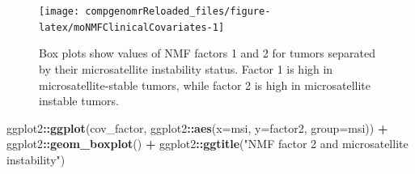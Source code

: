 \documentclass[12pt,]{krantz}
\newenvironment{Shaded}{\begin{snugshade}}{\end{snugshade}}
\newcommand{\DataTypeTok}[1]{\textcolor[rgb]{0.13,0.29,0.53}{#1}}
\newcommand{\KeywordTok}[1]{\textcolor[rgb]{0.13,0.29,0.53}{\textbf{#1}}}
\newcommand{\NormalTok}[1]{#1}
\newcommand{\OperatorTok}[1]{\textcolor[rgb]{0.81,0.36,0.00}{\textbf{#1}}}
\newcommand{\StringTok}[1]{\textcolor[rgb]{0.31,0.60,0.02}{#1}}
\begin{document}
\begin{Shaded}
\end{Shaded}

\begin{figure}

{\centering \texttt{[image: compgenomrReloaded\_files/figure-latex/moNMFClinicalCovariates-1]} 

}

\caption{Box plots show values of NMF factors 1 and 2 for tumors separated by their microsatellite instability status. Factor 1 is high in microsatellite-stable tumors, while factor 2 is high in microsatellite instable tumors.}\label{fig:moNMFClinicalCovariates1}
\end{figure}

\begin{Shaded}
\begin{Highlighting}[]
\NormalTok{ggplot2}\OperatorTok{::}\KeywordTok{ggplot}\NormalTok{(cov_factor, ggplot2}\OperatorTok{::}\KeywordTok{aes}\NormalTok{(}\DataTypeTok{x=}\NormalTok{msi, }\DataTypeTok{y=}\NormalTok{factor2, }\DataTypeTok{group=}\NormalTok{msi)) }\OperatorTok{+}\StringTok{ }\NormalTok{ggplot2}\OperatorTok{::}\KeywordTok{geom_boxplot}\NormalTok{() }\OperatorTok{+}\StringTok{ }\NormalTok{ggplot2}\OperatorTok{::}\KeywordTok{ggtitle}\NormalTok{(}\StringTok{"NMF factor 2 and microsatellite instability"}\NormalTok{)}
\end{Highlighting}
\end{Shaded}
\end{document}
